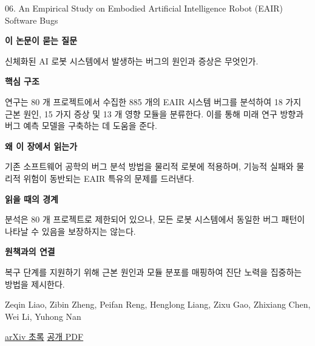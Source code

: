 \documentclass[11pt,openany]{book}
\begin{document}
\begin{termcard}{06. An Empirical Study on Embodied Artificial Intelligence Robot (EAIR) Software Bugs}

\par

\medskip

{\sffamily\bfseries\color{deepblue} 이 논문이 묻는 질문}\par

신체화된 AI 로봇 시스템에서 발생하는 버그의 원인과 증상은 무엇인가.

\smallskip

{\sffamily\bfseries\color{deepblue} 핵심 구조}\par

연구는 80 개 프로젝트에서 수집한 885 개의 EAIR 시스템 버그를 분석하여 18 가지 근본 원인, 15 가지 증상 및 13 개 영향 모듈을 분류한다. 이를 통해 미래 연구 방향과 버그 예측 모델을 구축하는 데 도움을 준다.

\smallskip

{\sffamily\bfseries\color{deepblue} 왜 이 장에서 읽는가}\par

기존 소프트웨어 공학의 버그 분석 방법을 물리적 로봇에 적용하며, 기능적 실패와 물리적 위험이 동반되는 EAIR 특유의 문제를 드러낸다.

\smallskip

{\sffamily\bfseries\color{coral} 읽을 때의 경계}\par

분석은 80 개 프로젝트로 제한되어 있으나, 모든 로봇 시스템에서 동일한 버그 패턴이 나타날 수 있음을 보장하지는 않는다.

\smallskip

{\sffamily\bfseries\color{teal} 원책과의 연결}\par

복구 단계를 지원하기 위해 근본 원인과 모듈 분포를 매핑하여 진단 노력을 집중하는 방법을 제시한다.

\medskip

{\footnotesize\color{muted} Zeqin Liao, Zibin Zheng, Peifan Reng, Henglong Liang, Zixu Gao, Zhixiang Chen, Wei Li, Yuhong Nan\par

\href{https://arxiv.org/abs/2507.18267}{arXiv 초록} \quad \href{https://arxiv.org/pdf/2507.18267}{공개 PDF}\par}

\end{termcard}
\end{document}
